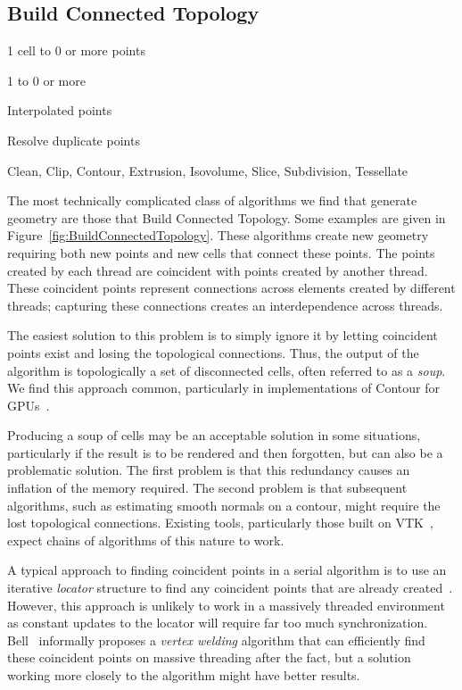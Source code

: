 \documentclass{sig-alternate}
\newcommand*{\lcite}[1]{~\cite{#1}}
\newcommand*{\scite}[1]{~\cite{#1}}
\newcommand*{\keyterm}[1]{\emph{#1}}
\newcommand{\algclass}[1]{\textsf{#1}}
\newcommand{\alg}[1]{#1}
\newcommand{\algorithmclasssection}[1]{\subsection*{#1}}
\newcommand{\algorithmclass}[6]{
  \algorithmclasssection{#1} %
  \begin{description}[leftmargin=9em,style=nextline,noitemsep]
    \raggedright
  \item[Point Mapping] #2
  \item[Cell Mapping] #3
  \item[Field Mapping] #4
  \item[Collective Work] #5
  \item[Algorithms] #6
  \end{description}
}
\begin{document}
\algorithmclass{Build Connected Topology}
               {1 cell to 0 or more points} %
               {1 to 0 or more} %
               {Interpolated points} %
               {Resolve duplicate points} %
               {
                 Clean,
                 Clip,
                 Contour,
                 Extrusion,
                 Isovolume,
                 Slice,
                 Subdivision,
                 Tessellate
               }

\noindent
The most technically complicated class of algorithms we find that generate
geometry are those that \algclass{Build Connected Topology}. Some examples
are given in Figure~\ref{fig:BuildConnectedTopology}. These algorithms
create new geometry requiring both new points and new cells that connect
these points. The points created by each thread are coincident with points
created by another thread. These coincident points represent connections
across elements created by different threads; capturing these connections
creates an interdependence across threads.

The easiest solution to this problem is to simply ignore it by letting
coincident points exist and losing the topological connections. Thus, the
output of the algorithm is topologically a set of disconnected cells, often
referred to as a \keyterm{soup}. We find this approach common, particularly
in implementations of \alg{Contour} for
GPUs\lcite{PISTON,Dyken2008,Pascucci2004,Klein2004}.

Producing a soup of cells may be an acceptable solution in some situations,
particularly if the result is to be rendered and then forgotten, but can
also be a problematic solution. The first problem is that this redundancy
causes an inflation of the memory required. The second problem is that
subsequent algorithms, such as estimating smooth normals on a contour,
might require the lost topological connections. Existing tools,
particularly those built on VTK\lcite{VTK}, expect chains of algorithms of
this nature to work.

A typical approach to finding coincident points in a serial algorithm is to
use an iterative \keyterm{locator} structure to find any coincident points
that are already created\lcite{VTKUsersGuide}. However, this approach is
unlikely to work in a massively threaded environment as constant updates to
the locator will require far too much synchronization. Bell\scite{Bell2010}
informally proposes a \keyterm{vertex welding} algorithm that can
efficiently find these coincident points on massive threading after the
fact, but a solution working more closely to the algorithm might have
better results.
\end{document}
